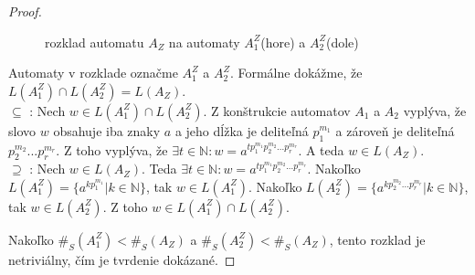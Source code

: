 \begin{proof}
\begin{figure}[H]
\centering
{}
\caption{rozklad automatu $ A_Z $ na automaty $ A_1^Z $(hore) a $ A_2^Z $(dole)}
\end{figure}

Automaty v rozklade označme $ A_1^Z $ a $ A_2^Z $. Formálne dokážme, že $ L(A_1^Z) \cap L(A_2^Z) = L(A_Z) $. \\
$ \subseteq $ : Nech $ w \in L(A_1^Z) \cap L(A_2^Z)$. Z konštrukcie automatov $ A_1 $ a $ A_2 $ vyplýva, že slovo $ w $ obsahuje iba znaky $ a $ a jeho dĺžka je deliteľná $ p_{1}^{m_1} $ a zároveň je deliteľná $p_{2}^{m_2}...p_{r}^{m_r} $. Z toho vyplýva, že $ \exists t \in \mathbb{N}: w = a^{tp_{1}^{m_1}p_{2}^{m_2}...p_{r}^{m_r}} $. A teda $ w \in L(A_Z) $. \\
$ \supseteq $ : Nech $ w \in L(A_Z)$. Teda $ \exists t \in \mathbb{N}: w = a^{tp_{1}^{m_1}p_{2}^{m_2}...p_{r}^{m_r}} $. Nakoľko $ L(A_1^Z) = \lbrace a^{kp_{1}^{m_1}} | k \in \mathbb{N} \rbrace $, tak $ w \in L(A_1^Z) $. Nakoľko $ L(A_2^Z) = \lbrace a^{kp_{2}^{m_2}...p_{r}^{m_r}} | k \in \mathbb{N} \rbrace $, tak $ w \in L(A_2^Z) $. Z toho $ w \in L(A_1^Z) \cap L(A_2^Z)$.
\par
Nakoľko $ \#_{S}(A_1^Z) < \#_{S}(A_Z) $ a $ \#_{S}(A_2^Z) < \#_{S}(A_Z) $, tento rozklad je netriviálny, čím je tvrdenie dokázané.

\end{proof}

